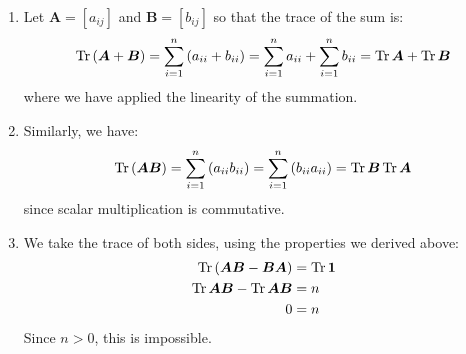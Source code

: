 \begin{sol}
\begin{enumerate}[label=\textbf{(\alph*)}]
    \item Let $\bm{A} = [a_{ij}]$ and $\bm{B} = [b_{ij}]$ so that the trace of the sum is:
    \begin{equation}
        \Tr\left(\bm{A}+\bm{B}\right) = \sum_{i=1}^n \left(a_{ii}+b_{ii}\right) = \sum_{i=1}^n a_{ii} + \sum_{i=1}^n b_{ii} = \Tr \bm{A} + \Tr \bm{B}
    \end{equation}
    where we have applied the linearity of the summation.
    \item Similarly, we have:
    \begin{equation}
        \Tr\left(\bm{A}\bm{B}\right) = \sum_{i=1}^n \left(a_{ii}b_{ii}\right) = \sum_{i=1}^n \left(b_{ii}a_{ii}\right) = \Tr \bm{B} \Tr \bm{A}
    \end{equation}
    since scalar multiplication is commutative.
    \item We take the trace of both sides, using the properties we derived above:
    \begin{align}
        \Tr\left(\bm{AB}-\bm{BA}\right) &= \Tr\bm{1} \\
        \Tr\bm{AB} - \Tr\bm{AB} &= n \\ 
        0 &= n
    \end{align}
    Since $n>0$, this is impossible.
\end{enumerate}
\end{sol}